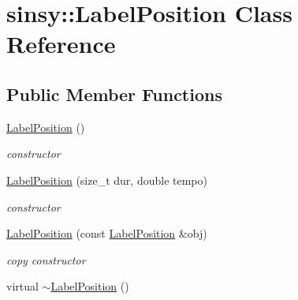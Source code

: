 \hypertarget{classsinsy_1_1LabelPosition}{\section{sinsy\-:\-:\-Label\-Position \-Class \-Reference}
\label{classsinsy_1_1LabelPosition}
}
\subsection*{\-Public \-Member \-Functions}
\begin{DoxyCompactItemize}
\item 
\hypertarget{classsinsy_1_1LabelPosition_a6a6261add8f0bb184176adfa6b928d19}{\hyperlink{classsinsy_1_1LabelPosition_a6a6261add8f0bb184176adfa6b928d19}{\-Label\-Position} ()}\label{classsinsy_1_1LabelPosition_a6a6261add8f0bb184176adfa6b928d19}

\begin{DoxyCompactList}\small\item\em constructor \end{DoxyCompactList}\item 
\hypertarget{classsinsy_1_1LabelPosition_a83dbcb24442688d370b5368dca02d969}{\hyperlink{classsinsy_1_1LabelPosition_a83dbcb24442688d370b5368dca02d969}{\-Label\-Position} (size\-\_\-t dur, double tempo)}\label{classsinsy_1_1LabelPosition_a83dbcb24442688d370b5368dca02d969}

\begin{DoxyCompactList}\small\item\em constructor \end{DoxyCompactList}\item 
\hypertarget{classsinsy_1_1LabelPosition_a3fc2b14b2710f75beff7db2e216c9f96}{\hyperlink{classsinsy_1_1LabelPosition_a3fc2b14b2710f75beff7db2e216c9f96}{\-Label\-Position} (const \hyperlink{classsinsy_1_1LabelPosition}{\-Label\-Position} \&obj)}\label{classsinsy_1_1LabelPosition_a3fc2b14b2710f75beff7db2e216c9f96}

\begin{DoxyCompactList}\small\item\em copy constructor \end{DoxyCompactList}\item 
\hypertarget{classsinsy_1_1LabelPosition_a8d20aa75f5cc895fe5f3e2b93bc418c6}{virtual \hyperlink{classsinsy_1_1LabelPosition_a8d20aa75f5cc895fe5f3e2b93bc418c6}{$\sim$\-Label\-Position} ()}\label{classsinsy_1_1LabelPosition_a8d20aa75f5cc895fe5f3e2b93bc418c6}


\end{DoxyCompactItemize}
